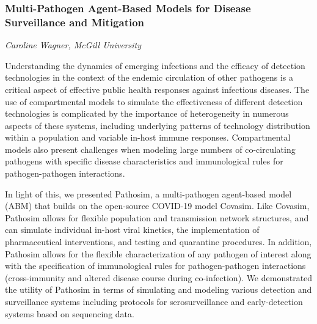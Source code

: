 \subsubsection*{Multi-Pathogen Agent-Based Models for Disease
Surveillance and Mitigation}
\textit{Caroline Wagner, McGill University}

Understanding the dynamics of emerging infections and
the efficacy of detection technologies in the context of the endemic
circulation of other pathogens is a critical aspect of effective public
health responses against infectious diseases. The use of compartmental
models to simulate the effectiveness of different detection technologies
is complicated by the importance of heterogeneity in numerous aspects of
these systems, including underlying patterns of technology distribution
within a population and variable in-host immune responses. Compartmental
models also present challenges when modeling large numbers of
co-circulating pathogens with specific disease characteristics and
immunological rules for pathogen-pathogen interactions. 

In light of
this, we presented Pathosim, a multi-pathogen agent-based model (ABM) that
builds on the open-source COVID-19 model Covasim. Like Covasim, Pathosim
allows for flexible population and transmission network structures, and
can simulate individual in-host viral kinetics, the implementation of
pharmaceutical interventions, and testing and quarantine procedures. In
addition, Pathosim allows for the flexible characterization of any
pathogen of interest along with the specification of immunological rules
for pathogen-pathogen interactions (\ie cross-immunity and altered
disease course during co-infection). We demonstrated the utility of
Pathosim in terms of simulating and modeling various detection and
surveillance systems including protocols for serosurveillance and
early-detection systems based on sequencing data.
